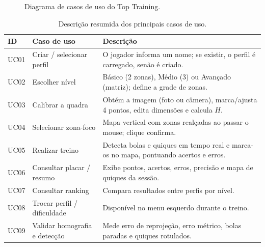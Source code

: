 \documentclass[a4paper,11pt]{article}
\begin{document}
\begin{figure}[H]
{}
\caption{Diagrama de casos de uso do Top Training.}
\label{fig:uc}
\end{figure}

\begin{table}[H]
\centering
\scriptsize
\renewcommand{\arraystretch}{1.2}
\caption{Descrição resumida dos principais casos de uso.}
\label{tab:uc}
\begin{tabularx}{\textwidth}{l l X}
\toprule
\textbf{ID} & \textbf{Caso de uso} & \textbf{Descrição} \\
\midrule
UC01 & Criar / selecionar perfil & O jogador informa um nome; se existir, o perfil é carregado, senão é criado. \\
\rowcolor{rowgray}
UC02 & Escolher nível & Básico (2 zonas), Médio (3) ou Avançado (matriz); define a grade de zonas. \\
UC03 & Calibrar a quadra & Obtém a imagem (foto ou câmera), marca/ajusta 4 pontos, edita dimensões e calcula $H$. \\
\rowcolor{rowgray}
UC04 & Selecionar zona-foco & Mapa vertical com zonas realçadas ao passar o mouse; clique confirma. \\
UC05 & Realizar treino & Detecta bolas e quiques em tempo real e marca-os no mapa, pontuando acertos e erros. \\
\rowcolor{rowgray}
UC06 & Consultar placar / resumo & Exibe pontos, acertos, erros, precisão e mapa de quiques da sessão. \\
UC07 & Consultar ranking & Compara resultados entre perfis por nível. \\
\rowcolor{rowgray}
UC08 & Trocar perfil / dificuldade & Disponível no menu esquerdo durante o treino. \\
UC09 & Validar homografia e detecção & Mede erro de reprojeção, erro métrico, bolas paradas e quiques rotulados. \\
\bottomrule
\end{tabularx}
\end{table}
\end{document}
